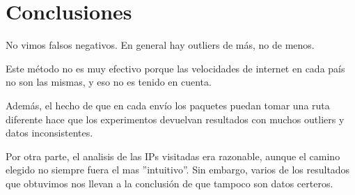 \section{Conclusiones}

No vimos falsos negativos. En general hay outliers de más, no de menos. 

Este método no es muy efectivo porque las velocidades de internet en cada país no son las mismas, y eso no es tenido en cuenta.

Además, el hecho de que en cada envío los paquetes puedan tomar una ruta diferente hace que los experimentos devuelvan resultados con muchos outliers y datos inconsistentes.

Por otra parte, el analisis de las IPs visitadas era razonable, aunque el camino elegido no siempre fuera el mas ''intuitivo''. Sin embargo, varios de los resultados que obtuvimos 
nos llevan a la conclusión de que tampoco son datos certeros.